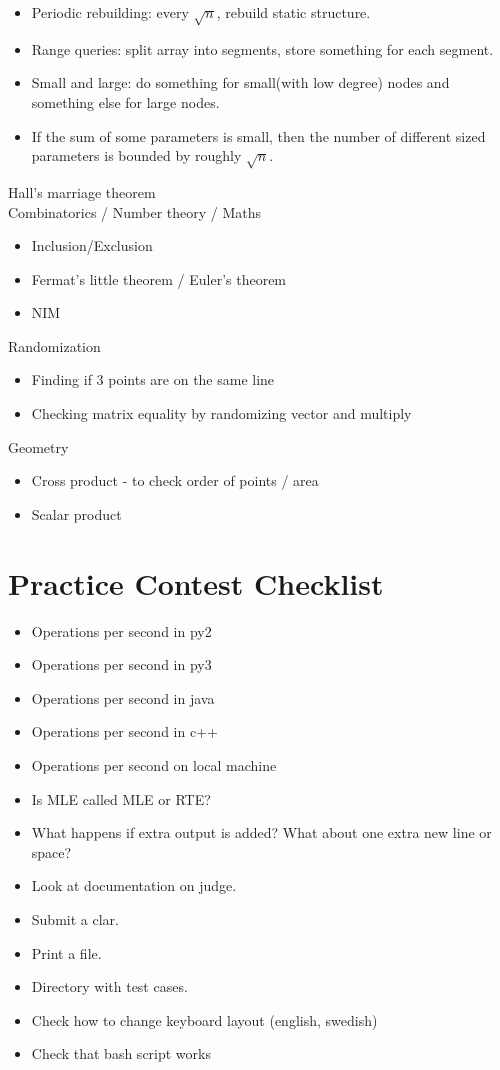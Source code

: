 \documentclass[8pt,a4paper,landscape,oneside]{amsart}
\begin{document}
\begin{multicols*}{2}
\begin{large}
\begin{itemize}
  \item Periodic rebuilding: every $\sqrt{n}$, rebuild static structure.
  \item Range queries: split array into segments, store something for each segment.
  \item Small and large: do something for small(with low degree) nodes and something else for large nodes.
  \item If the sum of some parameters is small, then the number of different sized parameters is bounded by roughly $\sqrt{n}$.
\end{itemize}
Hall's marriage theorem\\
Combinatorics / Number theory / Maths
\begin{itemize}
  \item Inclusion/Exclusion
  \item Fermat's little theorem / Euler's theorem
  \item NIM
\end{itemize}
Randomization
\begin{itemize}
  \item Finding if 3 points are on the same line
  \item Checking matrix equality by randomizing vector and multiply
\end{itemize}
Geometry
\begin{itemize}
  \item Cross product - to check order of points / area
  \item Scalar product
\end{itemize}
\vspace*{\fill}
\section{Practice Contest Checklist}
\begin{itemize}
    \item Operations per second in py2
    \item Operations per second in py3
    \item Operations per second in java
    \item Operations per second in c++
    \item Operations per second on local machine
    \item Is MLE called MLE or RTE?
    \item What happens if extra output is added? What about one extra new line or space?
    \item Look at documentation on judge.
    \item Submit a clar.
    \item Print a file.
    \item Directory with test cases.
    \item Check how to change keyboard layout (english, swedish)
    \item Check that bash script works
\end{itemize}

\end{large}
\end{multicols*}
\end{document}
